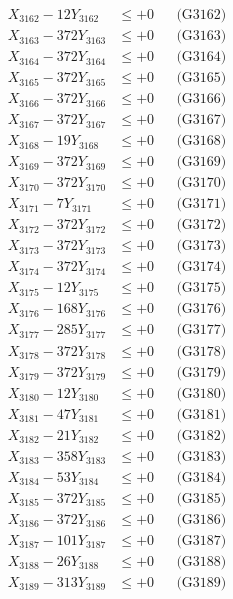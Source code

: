 \documentclass[a4paper,10pt]{article}
\begin{document}
{\begin{align}
X_{3162} - 12Y_{3162} &\leq +0 && \text{(G3162)} \\
X_{3163} - 372Y_{3163} &\leq +0 && \text{(G3163)} \\
X_{3164} - 372Y_{3164} &\leq +0 && \text{(G3164)} \\
X_{3165} - 372Y_{3165} &\leq +0 && \text{(G3165)} \\
X_{3166} - 372Y_{3166} &\leq +0 && \text{(G3166)} \\
X_{3167} - 372Y_{3167} &\leq +0 && \text{(G3167)} \\
X_{3168} - 19Y_{3168} &\leq +0 && \text{(G3168)} \\
X_{3169} - 372Y_{3169} &\leq +0 && \text{(G3169)} \\
X_{3170} - 372Y_{3170} &\leq +0 && \text{(G3170)} \\
\allowbreak
X_{3171} - 7Y_{3171} &\leq +0 && \text{(G3171)} \\
X_{3172} - 372Y_{3172} &\leq +0 && \text{(G3172)} \\
X_{3173} - 372Y_{3173} &\leq +0 && \text{(G3173)} \\
X_{3174} - 372Y_{3174} &\leq +0 && \text{(G3174)} \\
X_{3175} - 12Y_{3175} &\leq +0 && \text{(G3175)} \\
X_{3176} - 168Y_{3176} &\leq +0 && \text{(G3176)} \\
X_{3177} - 285Y_{3177} &\leq +0 && \text{(G3177)} \\
X_{3178} - 372Y_{3178} &\leq +0 && \text{(G3178)} \\
X_{3179} - 372Y_{3179} &\leq +0 && \text{(G3179)} \\
X_{3180} - 12Y_{3180} &\leq +0 && \text{(G3180)} \\
\allowbreak
X_{3181} - 47Y_{3181} &\leq +0 && \text{(G3181)} \\
X_{3182} - 21Y_{3182} &\leq +0 && \text{(G3182)} \\
X_{3183} - 358Y_{3183} &\leq +0 && \text{(G3183)} \\
X_{3184} - 53Y_{3184} &\leq +0 && \text{(G3184)} \\
X_{3185} - 372Y_{3185} &\leq +0 && \text{(G3185)} \\
X_{3186} - 372Y_{3186} &\leq +0 && \text{(G3186)} \\
X_{3187} - 101Y_{3187} &\leq +0 && \text{(G3187)} \\
X_{3188} - 26Y_{3188} &\leq +0 && \text{(G3188)} \\
X_{3189} - 313Y_{3189} &\leq +0 && \text{(G3189)} \\

\end{align}}
\end{document}
